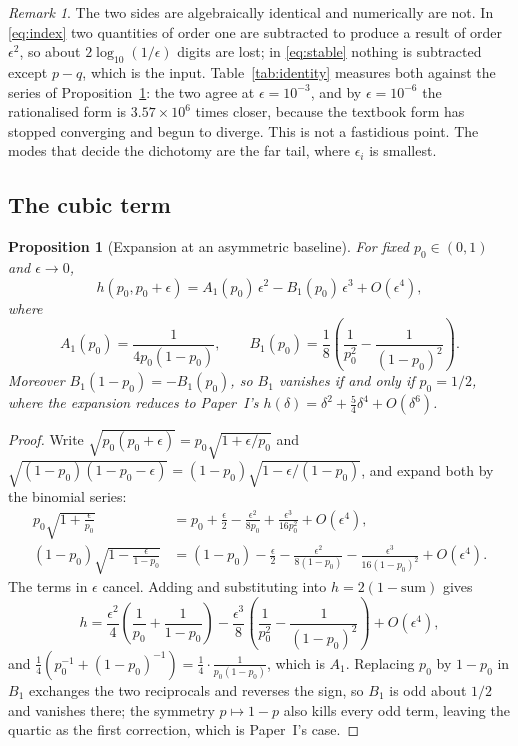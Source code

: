 \documentclass[11pt,reqno]{amsart}
\theoremstyle{plain}
\newtheorem{proposition}[theorem]{Proposition}
\theoremstyle{definition}
\theoremstyle{remark}
\newtheorem{remark}[theorem]{Remark}
\numberwithin{equation}{section}
\begin{document}
\begin{remark}
\label{rem:cancel}
The two sides are algebraically identical and numerically are not. In \eqref{eq:index} two quantities of order one are subtracted to produce a result of order $\epsilon^2$, so about $2\log_{10}(1/\epsilon)$ digits are lost; in \eqref{eq:stable} nothing is subtracted except $p-q$, which is the input. Table~\ref{tab:identity} measures both against the series of Proposition~\ref{prop:cubic}: the two agree at $\epsilon=10^{-3}$, and by $\epsilon=10^{-6}$ the rationalised form is $3.57\times10^{6}$ times closer, because the textbook form has stopped converging and begun to diverge. This is not a fastidious point. The modes that decide the dichotomy are the far tail, where $\epsilon_i$ is smallest.
\end{remark}

\subsection{The cubic term}

\begin{proposition}[Expansion at an asymmetric baseline]
\label{prop:cubic}
For fixed $p_0\in(0,1)$ and $\epsilon\to0$,
\begin{equation}
\label{eq:cubic}
h(p_0,p_0+\epsilon) = A_1(p_0)\,\epsilon^2 - B_1(p_0)\,\epsilon^3 + O(\epsilon^4),
\end{equation}
where
\begin{equation}
\label{eq:coeffs}
A_1(p_0) = \frac{1}{4p_0(1-p_0)},
\qquad
B_1(p_0) = \frac{1}{8}\left(\frac{1}{p_0^2}-\frac{1}{(1-p_0)^2}\right).
\end{equation}
Moreover $B_1(1-p_0)=-B_1(p_0)$, so $B_1$ vanishes if and only if $p_0=1/2$, where the expansion reduces to Paper~I's $h(\delta)=\delta^2+\tfrac54\delta^4+O(\delta^6)$.
\end{proposition}

\begin{proof}
Write $\sqrt{p_0(p_0+\epsilon)} = p_0\sqrt{1+\epsilon/p_0}$ and $\sqrt{(1-p_0)(1-p_0-\epsilon)} = (1-p_0)\sqrt{1-\epsilon/(1-p_0)}$, and expand both by the binomial series:
\begin{align*}
p_0\sqrt{1+\tfrac{\epsilon}{p_0}} &= p_0 + \tfrac{\epsilon}{2} - \tfrac{\epsilon^2}{8p_0} + \tfrac{\epsilon^3}{16p_0^2} + O(\epsilon^4),\\
(1-p_0)\sqrt{1-\tfrac{\epsilon}{1-p_0}} &= (1-p_0) - \tfrac{\epsilon}{2} - \tfrac{\epsilon^2}{8(1-p_0)} - \tfrac{\epsilon^3}{16(1-p_0)^2} + O(\epsilon^4).
\end{align*}
The terms in $\epsilon$ cancel. Adding and substituting into $h = 2(1-\text{sum})$ gives
\[
h = \frac{\epsilon^2}{4}\left(\frac{1}{p_0}+\frac{1}{1-p_0}\right) - \frac{\epsilon^3}{8}\left(\frac{1}{p_0^2}-\frac{1}{(1-p_0)^2}\right)+O(\epsilon^4),
\]
and $\tfrac14(p_0^{-1}+(1-p_0)^{-1}) = \tfrac14\cdot\tfrac{1}{p_0(1-p_0)}$, which is $A_1$. Replacing $p_0$ by $1-p_0$ in $B_1$ exchanges the two reciprocals and reverses the sign, so $B_1$ is odd about $1/2$ and vanishes there; the symmetry $p\mapsto1-p$ also kills every odd term, leaving the quartic as the first correction, which is Paper~I's case.
\end{proof}
\end{document}
